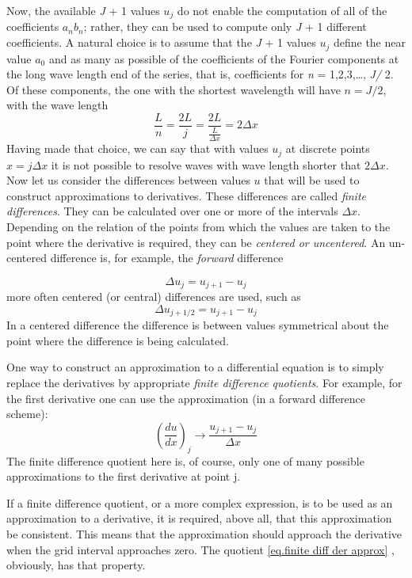 Now, the available \textit{J} + 1 values $u_j$ do not enable the computation of all of the coefficients $a_nb_n$; rather, they can be used to compute only \textit{J} + 1 different coefficients. A natural choice is to assume that the \textit{J} + 1 values $u_j$ define the near value $a_0$ and as many as possible of the coefficients of the Fourier components at the long wave length end of the series, that is, coefficients for \textit{n} = 1,2,3,…, \textit{J/} 2. Of these components, the one with the shortest wavelength will have $n=J/2$, with the wave length 
 $$\frac{L}{n}=\frac{2L}{j}=\frac{2L}{\frac{L}{\Delta x}}=2\Delta x$$
 Having made that choice, we can say that with values $u_j$ at discrete points $x=j\Delta x$ it is not possible to resolve waves with wave length shorter that $2\Delta x$. 
 Now let us consider the differences between values $u$ that will be used to construct approximations to derivatives. These differences are called \textit{finite differences}. They can be calculated over one or more of the intervals $\Delta x$. Depending on the relation of the points from which the values are taken to the point where the derivative is required, they can be \textit{centered or uncentered}. An un-centered difference is, for example, the \textit{forward} difference 

 \begin{equation}\label{eq: forward difference}
     \Delta u_j=u_{j+1}-u_j
 \end{equation}
 more often centered (or central) differences are used, such as 
\begin{equation}
     \Delta u_{j+1/2}=u_{j+1}-u_j
 \end{equation}
In a centered difference the difference is between values symmetrical about the point where the difference is being calculated.

One way to construct an approximation to a differential equation is to simply replace the derivatives by appropriate \textit{finite difference quotients}. For example, for the first derivative one can use the approximation (in a forward difference scheme):
\begin{equation}\label{eq.finite diff der approx}
    \left(\frac{d u}{dx}\right)_j\rightarrow\frac{u_{j+1}-u_j}{\Delta x}
\end{equation}
The finite difference quotient here is, of course, only one of many possible approximations to the first derivative at point j.

If a finite difference quotient, or a more complex expression, is to be used as an approximation to a deri­vative, it is required, above all, that this approximation be consistent. This means that the approximation should approach the derivative when the grid interval approaches zero. The quotient \ref{eq.finite diff der approx} , obviously, has that property.

